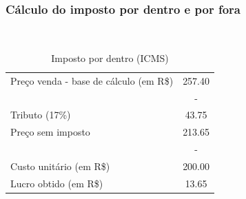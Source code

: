 \documentclass[11pt, hide notes]{beamer} %
\begin{document}
\begin{frame}[label=myslide16.6] %
	
	\frametitle{Cálculo do imposto por dentro e por fora} {\ %
		
		\begin{table}[H]
			\centering
			\caption{Imposto por dentro (ICMS)}
			\begin{tabular}{l|c}
				\toprule \midrule
				Preço venda - base de cálculo (em R\$) & 257.40 \\ 
				& - \\
				Tributo (17\%) & 43.75 \\ \midrule
				Preço sem imposto & 213.65 \\
				& - \\
				Custo unitário (em R\$) & 200.00 \\ \midrule
				Lucro obtido (em R\$) & 13.65 \\
				\bottomrule
			\end{tabular}%
			\label{tab3}%
		\end{table}%
		
		
	}
\end{frame}
\end{document}
